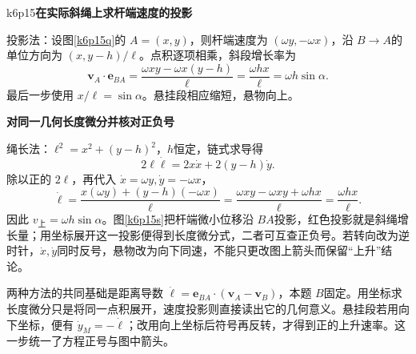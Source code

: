 \LectureAnswerSection

\begin{drillsolution}{k6p15}\textbf{在实际斜绳上求杆端速度的投影}\par\nobreak
投影法：设图\ref{k6p15q}的 $A=(x,y)$，则杆端速度为 $(\omega y,-\omega x)$，沿 $B\to A$的单位方向为 $(x,y-h)/\ell$。点积逐项相乘，斜段增长率为
\[
 \bm v_A\cdot\bm e_{BA}
 =\frac{\omega xy-\omega x(y-h)}\ell
 =\frac{\omega hx}{\ell}=\omega h\sin\alpha.
\]
最后一步使用 $x/\ell=\sin\alpha$。悬挂段相应缩短，悬物向上。



\par\medskip{}\noindent\textbf{对同一几何长度微分并核对正负号}\par\nobreak
绳长法：$\ell^2=x^2+(y-h)^2$，$h$恒定，链式求导得
\[
 2\ell\dot\ell=2x\dot x+2(y-h)\dot y.
\]
除以正的 $2\ell$，再代入 $\dot x=\omega y,\dot y=-\omega x$，
\[
 \dot\ell=\frac{x(\omega y)+(y-h)(-\omega x)}\ell
 =\frac{\omega xy-\omega xy+\omega hx}{\ell}
 =\frac{\omega hx}{\ell}.
\]
因此 $\boxed{v_{\text{上}}=\omega h\sin\alpha}$。图\ref{k6p15s}把杆端微小位移沿 $BA$投影，红色投影就是斜绳增长量；用坐标展开这一投影便得到长度微分式，二者可互查正负号。若转向改为逆时针，$\dot x,\dot y$同时反号，悬物改为向下同速，不能只更改图上箭头而保留“上升”结论。

两种方法的共同基础是距离导数 $\dot\ell=\bm e_{BA}\cdot(\bm v_A-\bm v_B)$，本题 $B$固定。用坐标求长度微分只是将同一点积展开，速度投影则直接读出它的几何意义。悬挂段若用向下坐标，便有 $\dot y_M=-\dot\ell$；改用向上坐标后符号再反转，才得到正的上升速率。这一步统一了方程正号与图中箭头。\end{drillsolution}

